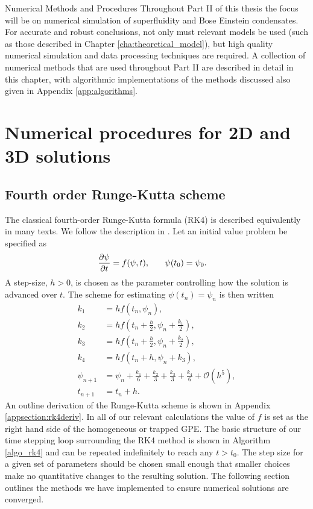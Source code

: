 \begin{chapter}{\label{cha:numerics}Numerical Methods and Procedures}
Throughout Part II of this thesis the focus will be on numerical simulation of superfluidity and Bose Einstein condensates. For accurate and robust conclusions, not only must relevant models be used (such as those described in Chapter \ref{cha:theoretical_model}), but high quality numerical simulation and data processing techniques are required. A collection of numerical methods that are used throughout Part II are described in detail in this chapter, with algorithmic implementations of the methods discussed also given in Appendix \ref{app:algorithms}.
\section{\label{section:RK} Numerical procedures for 2D and 3D solutions}
\subsection{\label{section:RK4} Fourth order Runge-Kutta scheme}
The classical fourth-order Runge-Kutta formula (RK4) is described equivalently in many texts. We follow the description in \cite{NumericalRecipes}. Let an initial value problem be specified as	
	\begin{align*}
		\frac{\partial \psi}{\partial t} &= f(\psi,t),\hspace{0.25in}\psi(t_0) = \psi_0.
	\end{align*}
A step-size, $h>0$, is chosen as the parameter controlling how the solution is advanced over $t$. The scheme for estimating $\psi(t_n)= \psi_n$ is then written
\begin{equation}
\begin{split}
		k_1 &= hf(t_n,\psi_n),\\
		k_2 &= hf(t_n+\frac{h}{2},\psi_n+\frac{k_1}{2}),\\
		k_3 &= hf(t_n+\frac{h}{2},\psi_n+\frac{k_2}{2}),\\
		k_4 &= hf(t_n+h,\psi_n+k_3),\\
		\psi_{n+1} &= \psi_n + \frac{k_1}{6}+ \frac{k_2}{3}+ \frac{k_3}{3} + \frac{k_4}{6} + \mathcal{O}(h^5),\\
		t_{n+1}  &= t_n + h.
		\label{eq:rk4}
\end{split}
\end{equation}
An outline derivation of the Runge-Kutta scheme is shown in Appendix \ref{appsection:rk4deriv}.	In all of our relevant calculations the value of $f$ is set as the right hand side of the homogeneous or trapped GPE. The basic structure of our time stepping loop surrounding the RK4 method is shown in Algorithm \ref{algo_rk4} and can be repeated indefinitely to reach any $t>t_0$. The step size for a given set of parameters should be chosen small enough that smaller choices make no quantitative changes to the resulting solution. The following section outlines the methods we have implemented to ensure numerical solutions are converged.


\end{chapter}
